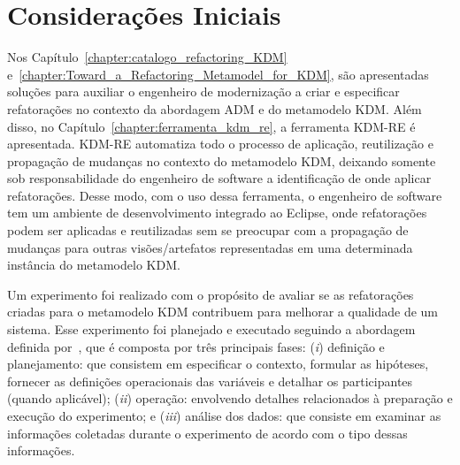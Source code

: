 \section{Considerações Iniciais}

Nos Capítulo~\ref{chapter:catalogo_refactoring_KDM} e~\ref{chapter:Toward_a_Refactoring_Metamodel_for_KDM}, são apresentadas soluções para auxiliar o engenheiro de modernização a criar e especificar refatorações no contexto da abordagem ADM e do metamodelo KDM. Além disso, no Capítulo~\ref{chapter:ferramenta_kdm_re}, a ferramenta KDM-RE é apresentada. KDM-RE automatiza todo o processo de aplicação, reutilização e propagação de mudanças no contexto do metamodelo KDM, deixando somente sob responsabilidade do engenheiro de software a identificação de onde aplicar refatorações. Desse modo, com o uso dessa ferramenta, o engenheiro de software tem um ambiente de desenvolvimento integrado ao Eclipse, onde refatorações podem ser aplicadas e reutilizadas sem se preocupar com a propagação de mudanças para outras visões/artefatos representadas em uma determinada instância do metamodelo KDM.

Um experimento foi realizado com o propósito de avaliar se as refatorações criadas para o metamodelo KDM contribuem para melhorar a qualidade de um sistema. Esse experimento foi planejado e executado seguindo a abordagem definida por~, que é composta por três principais fases: (\textit{i}) definição e planejamento: que consistem em especificar o contexto, formular as hipóteses, fornecer as definições operacionais das variáveis e detalhar os participantes (quando aplicável); (\textit{ii}) operação: envolvendo detalhes relacionados à preparação e execução do experimento; e (\textit{iii}) análise dos dados: que consiste em examinar as informações coletadas durante o experimento de acordo com o tipo dessas informações.



